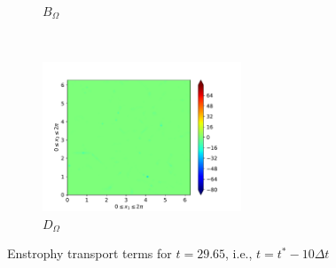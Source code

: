 \begin{figure}[H]
\begin{subfigure}{0.45\textwidth}
        \caption{$B_{\Omega}$}
    \end{subfigure}
    ~
    \begin{subfigure}{0.45\textwidth}
        \includegraphics[height=1.75in]{media/run-cds-65/D-enst-1330}
        \caption{$D_{\Omega}$}
    \end{subfigure}
    \caption{Enstrophy transport terms for $t=29.65$, i.e., $t=t^{\ast} - 10 \Delta t$}
    \label{fig:enst-1330}
\end{figure}

\newpage

